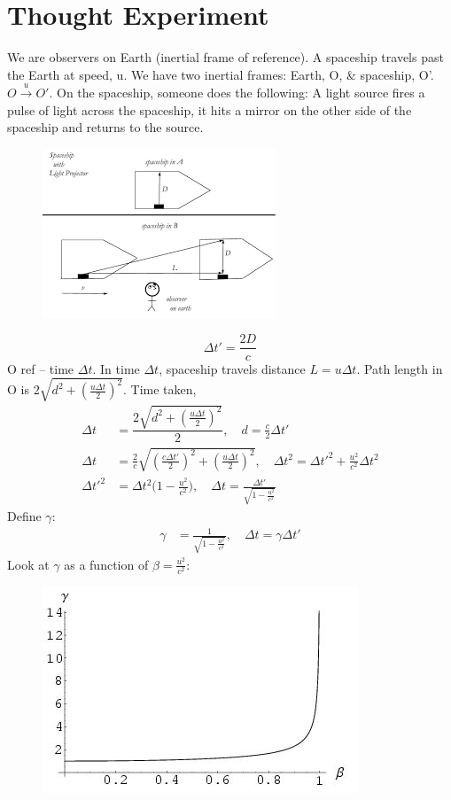 \documentclass[a4paper, 11pt, normalem]{report}
\begin{document}
\section{Thought Experiment}
We are observers on Earth (inertial frame of reference).
A spaceship travels past the Earth at speed, u.
We have two inertial frames: Earth, O, \& spaceship, O'.
$O \xrightarrow{u} O'$.
On the spaceship, someone does the following: 
A light source fires a pulse of light across the spaceship, it hits a mirror on the other side of the spaceship and returns to the source.
\begin{figure}[H]
    \centering
    \includegraphics{Gamma.png}
\end{figure}
\begin{equation}
    \Delta t' = \frac{2D}{c}
\end{equation}
O ref -- time $\Delta t$.
In time $\Delta t$, spaceship travels distance $L = u\Delta t$.
Path length in O is $2\sqrt{d^{2} + (\frac{u\Delta t}{2})^{2}}$.
Time taken,
\begin{align}
    \Delta t &= \dfrac{2\sqrt{d^{2} + (\frac{u\Delta t}{2})^{2}}}{2},\quad  d = \frac{c}{2}\Delta t' \\
    \Delta t &= \frac{2}{c}\sqrt{(\frac{c\Delta t'}{2})^{2} + (\frac{u\Delta t}{2})^{2}},\quad \Delta t^{2} = \Delta t'^{2} + \frac{u^{2}}{c^{2}}\Delta t^{2} \\
    \Delta t'^{2} &= \Delta t^{2}\Big(1 - \frac{u^{2}}{c^{2}}\Big),\quad \Delta t = \frac{\Delta t'}{\sqrt{1 - \tfrac{u^{2}}{c^{2}}}}
\end{align}
Define $\gamma$:
\begin{align}
    \gamma &= \frac{1}{\sqrt{1 - \tfrac{u^{2}}{c^{2}}}},\quad \Delta t = \gamma\Delta t'
\end{align}
Look at $\gamma$ as a function of $\beta = \frac{u^{2}}{c^{2}}$: 
\begin{figure}[H]
    \centering
    \includegraphics{Gammafn.jpg}
\end{figure}
\end{document}

